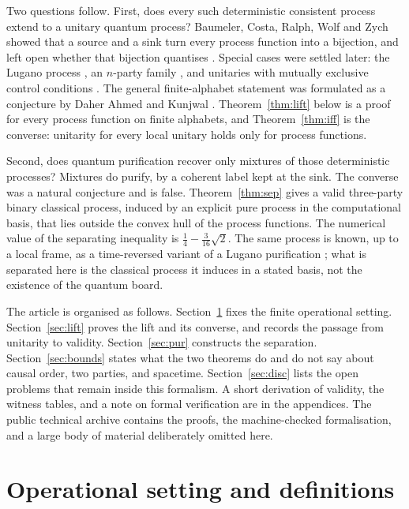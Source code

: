 \documentclass[11pt]{article}
\theoremstyle{definition}
\theoremstyle{remark}
\begin{document}
Two questions follow. First, does every such deterministic consistent process extend to a unitary quantum process? Baumeler, Costa, Ralph, Wolf and Zych showed that a source and a sink turn every process function into a bijection, and left open whether that bijection quantises \cite{baumeler2019}. Special cases were settled later: the Lugano process \cite{araujo2017}, an \(n\)-party family \cite{araujo2017b}, and unitaries with mutually exclusive control conditions \cite{daher2026}. The general finite-alphabet statement was formulated as a conjecture by Daher Ahmed and Kunjwal \cite{daher2026}. Theorem~\ref{thm:lift} below is a proof for every process function on finite alphabets, and Theorem~\ref{thm:iff} is the converse: unitarity for every local unitary holds only for process functions.

Second, does quantum purification recover only mixtures of those deterministic processes? Mixtures do purify, by a coherent label kept at the sink. The converse was a natural conjecture and is false. Theorem~\ref{thm:sep} gives a valid three-party binary classical process, induced by an explicit pure process in the computational basis, that lies outside the convex hull of the process functions. The numerical value of the separating inequality is \(\tfrac14-\tfrac{3}{16}\sqrt{2}\). The same process is known, up to a local frame, as a time-reversed variant of a Lugano purification \cite{guerin2018,baumeler2019}; what is separated here is the classical process it induces in a stated basis, not the existence of the quantum board.

The article is organised as follows. Section~\ref{sec:def} fixes the finite operational setting. Section~\ref{sec:lift} proves the lift and its converse, and records the passage from unitarity to validity. Section~\ref{sec:pur} constructs the separation. Section~\ref{sec:bounds} states what the two theorems do and do not say about causal order, two parties, and spacetime. Section~\ref{sec:disc} lists the open problems that remain inside this formalism. A short derivation of validity, the witness tables, and a note on formal verification are in the appendices. The public technical archive \cite{archive} contains the proofs, the machine-checked formalisation, and a large body of material deliberately omitted here.

\section{Operational setting and definitions}
\label{sec:def}
\end{document}
